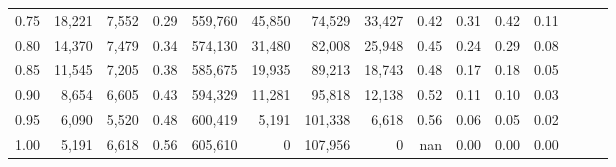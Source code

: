 \begin{tabular}{rrrrrrrrrrrrrrr}
0.75 &  18,221 &  7,552 &  0.29 &  559,760 &   45,850 &   74,529 &   33,427 &  0.42 &  0.31 &  0.42 &      0.11 \\
0.80 &  14,370 &  7,479 &  0.34 &  574,130 &   31,480 &   82,008 &   25,948 &  0.45 &  0.24 &  0.29 &      0.08 \\
0.85 &  11,545 &  7,205 &  0.38 &  585,675 &   19,935 &   89,213 &   18,743 &  0.48 &  0.17 &  0.18 &      0.05 \\
0.90 &   8,654 &  6,605 &  0.43 &  594,329 &   11,281 &   95,818 &   12,138 &  0.52 &  0.11 &  0.10 &      0.03 \\
0.95 &   6,090 &  5,520 &  0.48 &  600,419 &    5,191 &  101,338 &    6,618 &  0.56 &  0.06 &  0.05 &      0.02 \\
1.00 &   5,191 &  6,618 &  0.56 &  605,610 &        0 &  107,956 &        0 &   nan &  0.00 &  0.00 &      0.00 \\
\bottomrule
\end{tabular}
